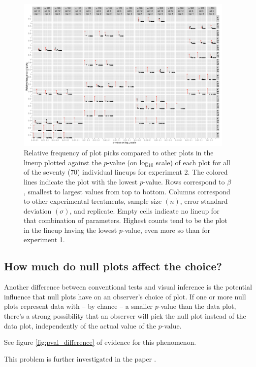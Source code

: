 \documentclass{article}
\newcommand{\hh}[1]{{\color{orange} #1}} %
\begin{document}
\begin{figure}[hbtp]
   \centering
       \includegraphics[width=0.95\textwidth]{p_val_log_counts2.pdf}
       \caption{Relative frequency of plot picks compared to other plots in the lineup plotted against the $p$-value (on log$_{10}$ scale) of each plot for all of the seventy (70) individual lineups for experiment 2. The colored lines indicate the plot with the lowest $p$-value. Rows correspond to $\beta$, smallest to largest values from top to bottom. Columns correspond to other experimental treatments, sample size $(n)$, error standard deviation $(\sigma)$, and replicate. Empty cells indicate no lineup for that combination of parameters. Highest counts tend to be the plot in the lineup having the lowest $p$-value, even more so than for experiment 1.}
       \label{fig:P-val_log2}
\end{figure}

\hh{
\subsection{How much do null plots affect the choice?}
Another difference between conventional tests and visual inference is the potential influence that null plots have on an observer's choice of plot. If one or more null plots represent data with -- by chance -- a smaller $p$-value than the data plot, there's a strong possibility that an observer will pick the null plot instead of the data plot, independently of the actual value of the $p$-value. 

See figure \ref{fig:pval_difference} of evidence for this phenomenon.

This problem is further investigated in the paper \cite{waldo}. 

}
\end{document}
